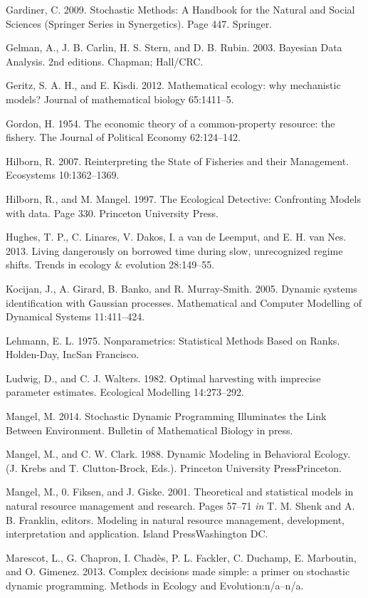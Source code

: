 \documentclass[]{components/elsarticle}
\begin{document}
Gardiner, C. 2009. Stochastic Methods: A Handbook for the Natural and
Social Sciences (Springer Series in Synergetics). Page 447. Springer.

Gelman, A., J. B. Carlin, H. S. Stern, and D. B. Rubin. 2003. Bayesian
Data Analysis. 2nd editions. Chapman; Hall/CRC.

Geritz, S. A. H., and E. Kisdi. 2012. Mathematical ecology: why
mechanistic models? Journal of mathematical biology 65:1411--5.

Gordon, H. 1954. The economic theory of a common-property resource: the
fishery. The Journal of Political Economy 62:124--142.

Hilborn, R. 2007. Reinterpreting the State of Fisheries and their
Management. Ecosystems 10:1362--1369.

Hilborn, R., and M. Mangel. 1997. The Ecological Detective: Confronting
Models with data. Page 330. Princeton University Press.

Hughes, T. P., C. Linares, V. Dakos, I. a van de Leemput, and E. H. van
Nes. 2013. Living dangerously on borrowed time during slow, unrecognized
regime shifts. Trends in ecology \& evolution 28:149--55.

Kocijan, J., A. Girard, B. Banko, and R. Murray-Smith. 2005. Dynamic
systems identification with Gaussian processes. Mathematical and
Computer Modelling of Dynamical Systems 11:411--424.

Lehmann, E. L. 1975. Nonparametrics: Statistical Methods Based on Ranks.
Holden-Day, IncSan Francisco.

Ludwig, D., and C. J. Walters. 1982. Optimal harvesting with imprecise
parameter estimates. Ecological Modelling 14:273--292.

Mangel, M. 2014. Stochastic Dynamic Programming Illuminates the Link
Between Environment. Bulletin of Mathematical Biology in press.

Mangel, M., and C. W. Clark. 1988. Dynamic Modeling in Behavioral
Ecology. (J. Krebs and T. Clutton-Brock, Eds.). Princeton University
PressPrinceton.

Mangel, M., 0. Fiksen, and J. Giske. 2001. Theoretical and statistical
models in natural resource management and research. Pages 57--71
\emph{in} T. M. Shenk and A. B. Franklin, editors. Modeling in natural
resource management, development, interpretation and application. Island
PressWashington DC.

Marescot, L., G. Chapron, I. Chadès, P. L. Fackler, C. Duchamp, E.
Marboutin, and O. Gimenez. 2013. Complex decisions made simple: a primer
on stochastic dynamic programming. Methods in Ecology and
Evolution:n/a--n/a.
\end{document}
